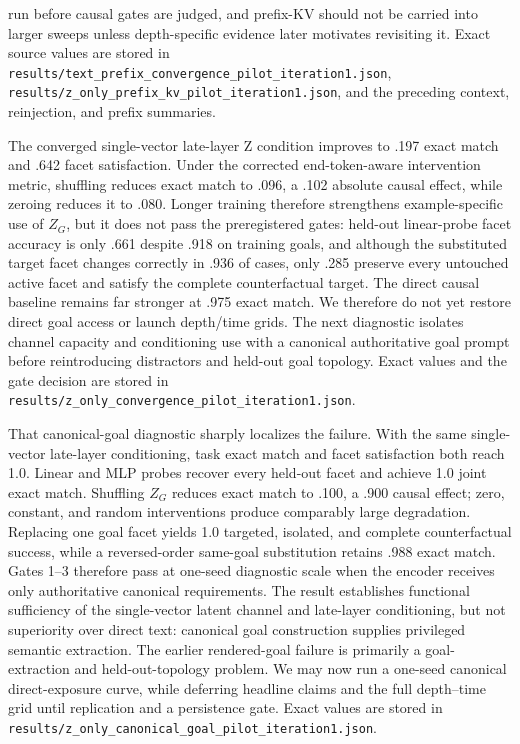 \documentclass[11pt]{article}
\begin{document}
run before causal gates are judged, and prefix-KV should not be carried into larger sweeps unless depth-specific evidence later motivates revisiting it. Exact source values are stored in \texttt{results/text\_prefix\_convergence\_pilot\_iteration1.json}, \texttt{results/z\_only\_prefix\_kv\_pilot\_iteration1.json}, and the preceding context, reinjection, and prefix summaries.

The converged single-vector late-layer Z condition improves to .197 exact match and .642 facet satisfaction. Under the corrected end-token-aware intervention metric, shuffling reduces exact match to .096, a .102 absolute causal effect, while zeroing reduces it to .080. Longer training therefore strengthens example-specific use of $Z_G$, but it does not pass the preregistered gates: held-out linear-probe facet accuracy is only .661 despite .918 on training goals, and although the substituted target facet changes correctly in .936 of cases, only .285 preserve every untouched active facet and satisfy the complete counterfactual target. The direct causal baseline remains far stronger at .975 exact match. We therefore do not yet restore direct goal access or launch depth/time grids. The next diagnostic isolates channel capacity and conditioning use with a canonical authoritative goal prompt before reintroducing distractors and held-out goal topology. Exact values and the gate decision are stored in \texttt{results/z\_only\_convergence\_pilot\_iteration1.json}.

That canonical-goal diagnostic sharply localizes the failure. With the same single-vector late-layer conditioning, task exact match and facet satisfaction both reach 1.0. Linear and MLP probes recover every held-out facet and achieve 1.0 joint exact match. Shuffling $Z_G$ reduces exact match to .100, a .900 causal effect; zero, constant, and random interventions produce comparably large degradation. Replacing one goal facet yields 1.0 targeted, isolated, and complete counterfactual success, while a reversed-order same-goal substitution retains .988 exact match. Gates 1--3 therefore pass at one-seed diagnostic scale when the encoder receives only authoritative canonical requirements. The result establishes functional sufficiency of the single-vector latent channel and late-layer conditioning, but not superiority over direct text: canonical goal construction supplies privileged semantic extraction. The earlier rendered-goal failure is primarily a goal-extraction and held-out-topology problem. We may now run a one-seed canonical direct-exposure curve, while deferring headline claims and the full depth--time grid until replication and a persistence gate. Exact values are stored in \texttt{results/z\_only\_canonical\_goal\_pilot\_iteration1.json}.
\end{document}
